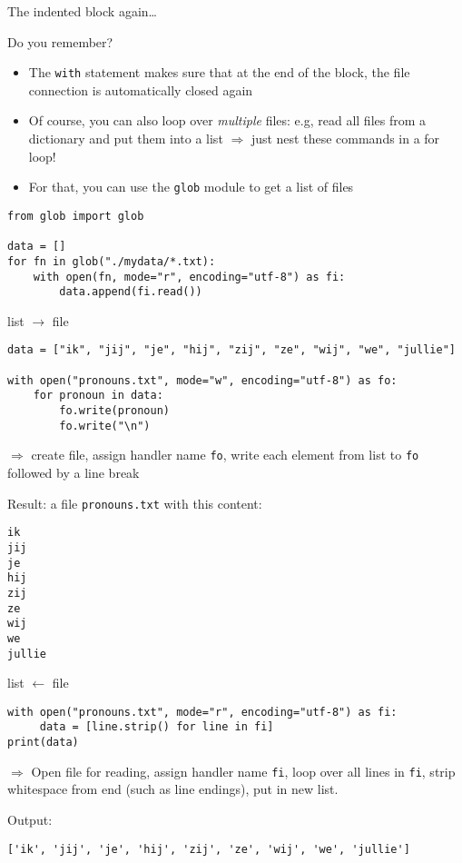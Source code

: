 \begin{frame}[fragile]{The indented block again\ldots}
	
\begin{block}{Do you remember?}
	\begin{itemize}
		\item The \texttt{with} statement makes sure that at the end of the block, the file connection is automatically closed again
		\item Of course, you can also loop over \emph{multiple} files: e.g, read all files from a dictionary and put them into a list $\Rightarrow$ just nest these commands in a for loop!
		\item For that, you can use the \texttt{glob} module to get a list of files
	\end{itemize}
\end{block}

\pause

\begin{verbatim}
from glob import glob

data = []
for fn in glob("./mydata/*.txt):
    with open(fn, mode="r", encoding="utf-8") as fi:
        data.append(fi.read())
\end{verbatim}


\end{frame}





\begin{frame}[fragile]{list $\rightarrow$ file}
\begin{verbatim}
data = ["ik", "jij", "je", "hij", "zij", "ze", "wij", "we", "jullie"]

with open("pronouns.txt", mode="w", encoding="utf-8") as fo:
    for pronoun in data:
        fo.write(pronoun)
        fo.write("\n")
\end{verbatim}
$\Rightarrow$ create file, assign handler name \texttt{fo}, write each element from list to \texttt{fo} followed by a line break

Result: a file \texttt{pronouns.txt} with this content:
\begin{verbatim}
ik
jij
je
hij
zij
ze
wij
we
jullie
\end{verbatim}
\end{frame}



\begin{frame}[fragile]{list $\leftarrow$ file}
\begin{verbatim}
with open("pronouns.txt", mode="r", encoding="utf-8") as fi:
     data = [line.strip() for line in fi]
print(data)
\end{verbatim}
$\Rightarrow$ Open file for reading, assign handler name \texttt{fi}, loop over all lines in \texttt{fi}, strip whitespace from end (such as line endings), put in new list.

Output:
\begin{verbatim}
['ik', 'jij', 'je', 'hij', 'zij', 'ze', 'wij', 'we', 'jullie']
\end{verbatim}
\end{frame}


